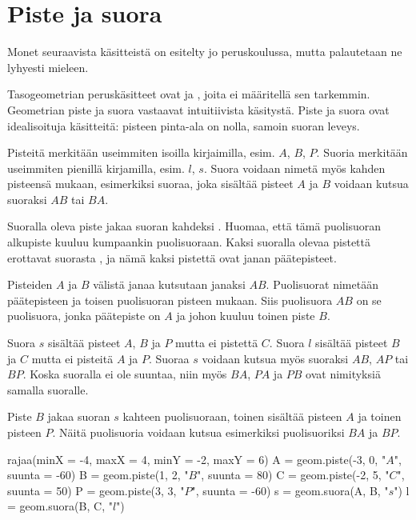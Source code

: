 \section*{Piste ja suora}

Monet seuraavista käsitteistä on esitelty jo peruskoulussa, mutta palautetaan ne lyhyesti
mieleen.

Tasogeometrian peruskäsitteet ovat  ja , joita ei
määritellä sen tarkemmin. Geometrian piste ja suora vastaavat intuitiivista käsitystä.
Piste ja suora ovat idealisoituja käsitteitä: pisteen pinta-ala on nolla, samoin suoran leveys.

Pisteitä merkitään useimmiten isoilla kirjaimilla, esim. $A$, $B$, $P$. Suoria merkitään useimmiten pienillä kirjamilla, esim. $l$, $s$. Suora voidaan nimetä myös kahden pisteensä mukaan, esimerkiksi suoraa, joka sisältää pisteet $A$ ja $B$ voidaan kutsua suoraksi $AB$ tai $BA$.

Suoralla oleva piste jakaa suoran kahdeksi . Huomaa, että tämä puolisuoran
alkupiste kuuluu kumpaankin puolisuoraan. Kaksi suoralla olevaa pistettä erottavat suorasta
, ja nämä kaksi pistettä ovat janan päätepisteet.

Pisteiden $A$ ja $B$ välistä janaa kutsutaan janaksi $AB$. Puolisuorat nimetään päätepisteen ja toisen puolisuoran pisteen mukaan. Siis puolisuora $AB$ on se puolisuora, jonka päätepiste on $A$ ja johon kuuluu toinen piste $B$.

\begin{esimerkki}
Suora $s$ sisältää pisteet $A$, $B$ ja $P$ mutta ei pistettä $C$. Suora $l$ sisältää pisteet $B$ ja $C$ mutta ei pisteitä $A$ ja $P$. Suoraa $s$ voidaan kutsua myös suoraksi $AB$, $AP$ tai $BP$. Koska suoralla ei ole suuntaa, niin myös $BA$, $PA$ ja $PB$ ovat nimityksiä samalla suoralle.

Piste $B$ jakaa suoran $s$ kahteen puolisuoraan, toinen sisältää pisteen $A$ ja toinen pisteen $P$. Näitä puolisuoria voidaan kutsua esimerkiksi puolisuoriksi $BA$ ja $BP$.

\begin{center}
\begin{kuva}
	rajaa(minX = -4, maxX = 4, minY = -2, maxY = 6)
	A = geom.piste(-3, 0, "$A$", suunta = -60)
	B = geom.piste(1, 2, "$B$", suunta = 80)
	C = geom.piste(-2, 5, "$C$", suunta = 50)
	P = geom.piste(3, 3, "$P$", suunta = -60)
	s = geom.suora(A, B, "$s$")
	l = geom.suora(B, C, "$l$")
\end{kuva}
\end{center}
\end{esimerkki}

